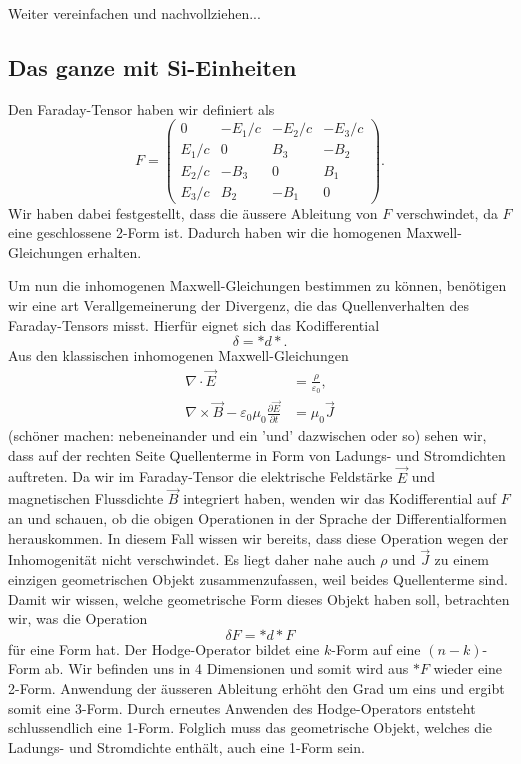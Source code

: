 Weiter vereinfachen und nachvollziehen...

\subsection{Das ganze mit Si-Einheiten}
Den Faraday-Tensor haben wir definiert als
\begin{equation}
	F = \begin{pmatrix}
		0 & -E_1/c & -E_2/c & -E_3/c \\ E_1/c & 0 & B_3 & -B_2 \\ E_2/c & -B_3 & 0 & B_1 \\ E_3/c & B_2 & -B_1 & 0 
	\end{pmatrix}.
\end{equation}
Wir haben dabei festgestellt, dass die äussere Ableitung von $F$ verschwindet, da $F$ eine geschlossene 2-Form ist. Dadurch haben wir die homogenen Maxwell-Gleichungen erhalten. 

Um nun die inhomogenen Maxwell-Gleichungen bestimmen zu können, benötigen wir eine art Verallgemeinerung der Divergenz, die das Quellenverhalten des Faraday-Tensors misst. Hierfür eignet sich das Kodifferential
\begin{equation*}
	\delta = \ast d \ast.
\end{equation*}
Aus den klassischen inhomogenen Maxwell-Gleichungen
\begin{align}
	\nabla \cdot \vec{E} &= \frac{\rho}{\varepsilon_0},\\
	\nabla \times \vec{B} - \varepsilon_0 \mu_0 \frac{\partial \vec{E}}{\partial t}&= \mu_0 \vec{J}
\end{align}
(schöner machen: nebeneinander und ein 'und' dazwischen oder so)
sehen wir, dass auf der rechten Seite Quellenterme in Form von Ladungs- und Stromdichten auftreten.
Da wir im Faraday-Tensor die elektrische Feldstärke $\vec{E}$ und magnetischen Flussdichte $\vec{B}$ integriert haben, wenden wir das Kodifferential auf $F$ an und schauen, ob die obigen Operationen in der Sprache der Differentialformen herauskommen.
In diesem Fall wissen wir bereits, dass diese Operation wegen der Inhomogenität nicht verschwindet.
Es liegt daher nahe auch $\rho$ und $\vec{J}$ zu einem einzigen geometrischen Objekt zusammenzufassen, weil beides Quellenterme sind.
Damit wir wissen, welche geometrische Form dieses Objekt haben soll, betrachten wir, was die Operation 
\begin{equation*}
	\delta F = \ast d\ast F
\end{equation*}
für eine Form hat.
Der Hodge-Operator bildet eine $k$-Form auf eine $(n-k)$-Form ab.
Wir befinden uns in 4 Dimensionen und somit wird aus $\ast F$ wieder eine 2-Form.
Anwendung der äusseren Ableitung erhöht den Grad um eins und ergibt somit eine 3-Form.
Durch erneutes Anwenden des Hodge-Operators entsteht schlussendlich eine 1-Form.
Folglich muss das geometrische Objekt, welches die Ladungs- und Stromdichte enthält, auch eine 1-Form sein.

